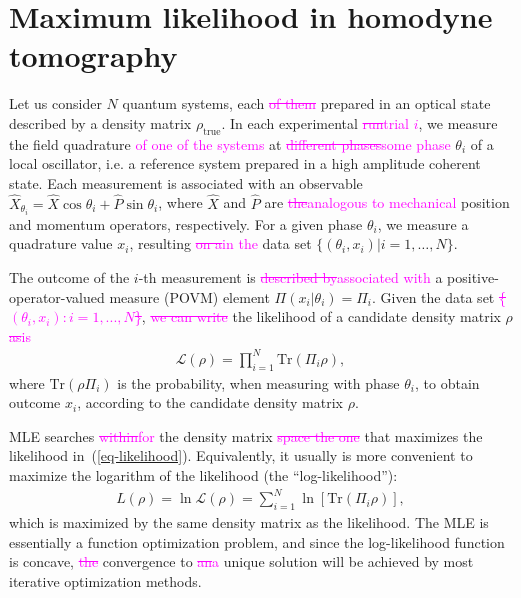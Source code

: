 \documentclass[
reprint,
superscriptaddress,
showpacs,
amsmath,
amssymb,
aps,
pra,
longbibliography
]{revtex4-1}
\providecommand{\aucmnt}[1]{#1}
\providecommand{\editcolor}[2]{\textcolor{#1}{#2}}
\providecommand{\aucmnt}[1]{}
\providecommand{\editcolor}[2]{#2}
\newcommand{\SG}[1]{\editcolor{magenta}{#1}}
\newcommand{\SGs}[1]{\aucmnt{\editcolor{magenta}{\sout{#1}}}}
\newcommand{\rhotrue}{\rho_{\text{true}}}
\begin{document}
\section{Maximum likelihood in homodyne tomography}
\label{MLE}
Let us consider $N$ quantum systems, each \SGs{of them }prepared in an
optical state described by a density matrix $\rhotrue$. In each
experimental \SGs{run}\SG{trial $i$}, we measure the field quadrature
\SG{of one of the systems} at \SGs{different phases}\SG{some phase}
$\theta_i$ of a local oscillator, i.e. a reference system prepared in
a high amplitude coherent state. Each measurement is associated with
an observable
$\hat{X}_{\theta_i} = \hat{X} \cos \theta_i + \hat{P} \sin \theta_i$,
where $\hat{X}$ and $\hat{P}$ are \SGs{the}\SG{analogous to
  mechanical} position and momentum operators, respectively. For a
given phase $\theta_i$, we measure a quadrature value $x_i$, resulting
\SGs{on a}\SG{in the} data set
$\{(\theta_i, x_i)| i = 1, \ldots, N\}$.

The outcome of the $i$-th measurement is \SGs{described
  by}\SG{associated with} a positive-operator-valued measure (POVM)
element $\Pi (x_i|\theta_i) = \Pi_i$. Given the data set
\SGs{\{$(\theta_{i}, x_i): i = 1, ..., N$\}}, \SGs{we can write} the
likelihood of a candidate density matrix $\rho$ \SGs{as}\SG{is}
\begin{eqnarray}
  \mathcal{L} (\rho)= \prod_{i=1}^{N} \mathrm{Tr} (\Pi_i \rho),
  \label{eq-likelihood}
\end{eqnarray}
where $\mathrm{Tr}(\rho \Pi_i)$ is the probability, when measuring
with phase $\theta_i$, to obtain outcome $x_i$, according to the
candidate density matrix $\rho$.

MLE searches \SGs{within}\SG{for} the density matrix \SGs{space the
  one} that maximizes the likelihood
in~(\ref{eq-likelihood}). Equivalently, it usually is more convenient
to maximize the logarithm of the likelihood (the ``log-likelihood''):
\begin{eqnarray}
  L (\rho) = \ln \mathcal{L} (\rho)= \sum_{i=1}^{N} \ln [\mathrm{Tr} (\Pi_i \rho)],
\end{eqnarray} 
which is maximized by the same density matrix as the likelihood. The
MLE is essentially a function optimization problem, and since the
log-likelihood function is concave, \SGs{the} convergence to
\SGs{an}\SG{a} unique solution will be achieved by most iterative
optimization methods.
\end{document}
